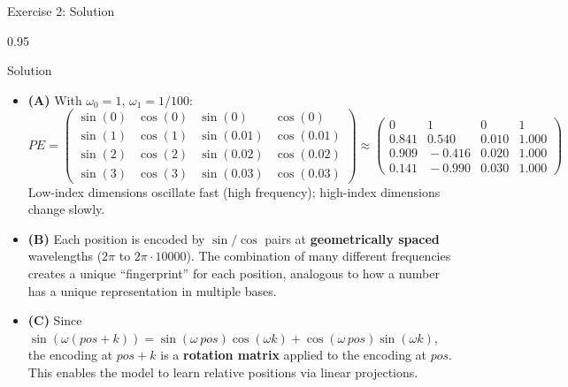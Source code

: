 \documentclass[9pt, aspectratio=169, t]{beamer}
\begin{document}
\begin{frame}{Exercise 2: Solution}
    \begin{cminipage}{0.95\textwidth}
    \begin{exampleblock}{Solution}
        {\footnotesize
        \begin{itemize}\setlength{\itemsep}{3pt}
            \item \textcolor{MainBlue}{\textbf{(A)}} With $\omega_0 = 1$, $\omega_1 = 1/100$:
                \[
                    PE = \begin{pmatrix}
                        \sin(0) & \cos(0) & \sin(0) & \cos(0) \\
                        \sin(1) & \cos(1) & \sin(0.01) & \cos(0.01) \\
                        \sin(2) & \cos(2) & \sin(0.02) & \cos(0.02) \\
                        \sin(3) & \cos(3) & \sin(0.03) & \cos(0.03)
                    \end{pmatrix}
                    \approx \begin{pmatrix}
                        0 & 1 & 0 & 1 \\
                        0.841 & 0.540 & 0.010 & 1.000 \\
                        0.909 & \!-0.416 & 0.020 & 1.000 \\
                        0.141 & \!-0.990 & 0.030 & 1.000
                    \end{pmatrix}
                \]
                Low-index dimensions oscillate fast (high frequency); high-index dimensions change slowly.
            \item \textcolor{MainBlue}{\textbf{(B)}} Each position is encoded by $\sin/\cos$ pairs at \textbf{geometrically spaced} wavelengths ($2\pi$ to $2\pi\cdot 10000$). The combination of many different frequencies creates a unique ``fingerprint'' for each position, analogous to how a number has a unique representation in multiple bases.
            \item \textcolor{MainBlue}{\textbf{(C)}} Since $\sin(\omega(pos+k)) = \sin(\omega\, pos)\cos(\omega k) + \cos(\omega\, pos)\sin(\omega k)$, the encoding at $pos+k$ is a \textbf{rotation matrix} applied to the encoding at $pos$. This enables the model to learn relative positions via linear projections.
        \end{itemize}
        }
    \end{exampleblock}
    \end{cminipage}
\end{frame}
\end{document}
